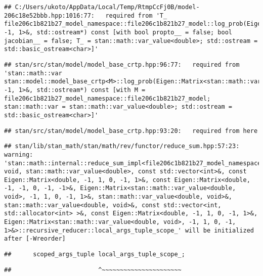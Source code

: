 \documentclass[
]{article}
\begin{document}
\begin{verbatim}
## C:/Users/ukoto/AppData/Local/Temp/RtmpCcFj0B/model-206c18e52bbb.hpp:1016:77:   required from 'T_ file206c1b821b27_model_namespace::file206c1b821b27_model::log_prob(Eigen::Matrix<T_job_param, -1, 1>&, std::ostream*) const [with bool propto__ = false; bool jacobian__ = false; T_ = stan::math::var_value<double>; std::ostream = std::basic_ostream<char>]'
\end{verbatim}

\begin{verbatim}
## stan/src/stan/model/model_base_crtp.hpp:96:77:   required from 'stan::math::var stan::model::model_base_crtp<M>::log_prob(Eigen::Matrix<stan::math::var_value<double>, -1, 1>&, std::ostream*) const [with M = file206c1b821b27_model_namespace::file206c1b821b27_model; stan::math::var = stan::math::var_value<double>; std::ostream = std::basic_ostream<char>]'
\end{verbatim}

\begin{verbatim}
## stan/src/stan/model/model_base_crtp.hpp:93:20:   required from here
\end{verbatim}

\begin{verbatim}
## stan/lib/stan_math/stan/math/rev/functor/reduce_sum.hpp:57:23: warning: 'stan::math::internal::reduce_sum_impl<file206c1b821b27_model_namespace::partial_log_lik_rsfunctor__, void, stan::math::var_value<double>, const std::vector<int>&, const Eigen::Matrix<double, -1, 1, 0, -1, 1>&, const Eigen::Matrix<double, -1, -1, 0, -1, -1>&, Eigen::Matrix<stan::math::var_value<double, void>, -1, 1, 0, -1, 1>&, stan::math::var_value<double, void>&, stan::math::var_value<double, void>&, const std::vector<int, std::allocator<int> >&, const Eigen::Matrix<double, -1, 1, 0, -1, 1>&, Eigen::Matrix<stan::math::var_value<double, void>, -1, 1, 0, -1, 1>&>::recursive_reducer::local_args_tuple_scope_' will be initialized after [-Wreorder]
\end{verbatim}

\begin{verbatim}
##      scoped_args_tuple local_args_tuple_scope_;
\end{verbatim}

\begin{verbatim}
##                        ^~~~~~~~~~~~~~~~~~~~~~~
\end{verbatim}
\end{document}
